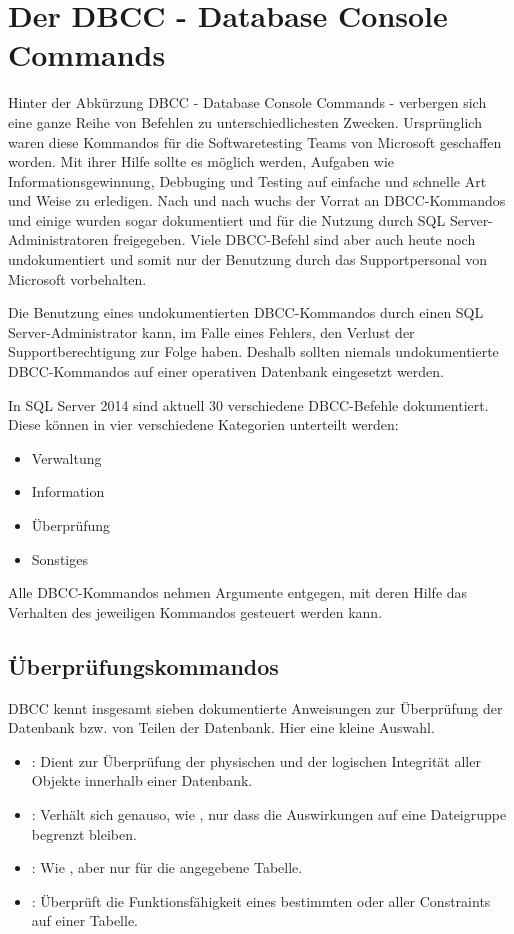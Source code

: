     \section{Der DBCC - Database Console Commands}
      Hinter der Abkürzung DBCC - Database Console Commands - verbergen sich
      eine ganze Reihe von Befehlen zu unterschiedlichesten Zwecken.
      Ursprünglich waren diese Kommandos f\"ur die Softwaretesting Teams von
      Microsoft geschaffen worden. Mit ihrer Hilfe sollte es möglich
      werden, Aufgaben wie Informationsgewinnung, Debbuging und Testing auf
      einfache und schnelle Art und Weise zu erledigen. Nach und nach wuchs
      der Vorrat an DBCC-Kommandos und einige wurden sogar dokumentiert und
      f\"ur die Nutzung durch SQL Server-Administratoren freigegeben. Viele
      DBCC-Befehl sind aber auch heute noch undokumentiert und somit nur der
      Benutzung durch das Supportpersonal von Microsoft vorbehalten.
      \begin{merke}
        Die Benutzung eines undokumentierten DBCC-Kommandos durch einen SQL
        Server-Administrator kann, im Falle eines Fehlers, den Verlust der
        Supportberechtigung zur Folge haben. Deshalb sollten niemals
        undokumentierte DBCC-Kommandos auf einer operativen Datenbank
        eingesetzt werden.
      \end{merke}
      In SQL Server 2014 sind aktuell 30 verschiedene DBCC-Befehle
      dokumentiert. Diese können in vier verschiedene Kategorien unterteilt
      werden:
      \begin{itemize}
          \item Verwaltung
          \item Information
          \item Überprüfung
          \item Sonstiges
      \end{itemize}
      Alle DBCC-Kommandos nehmen Argumente entgegen, mit deren Hilfe das
      Verhalten des jeweiligen Kommandos gesteuert werden kann.
      \subsection{Überprüfungskommandos}
        DBCC kennt  insgesamt sieben dokumentierte Anweisungen zur Überprüfung
        der Datenbank bzw. von Teilen der Datenbank. Hier eine kleine Auswahl.
        \begin{itemize}
          \item {}: Dient zur Überprüfung der
          physischen und der logischen Integrität aller Objekte innerhalb
          einer Datenbank.
          \item {}: Verhält sich genauso, wie
          , nur dass die Auswirkungen auf eine
          Dateigruppe begrenzt bleiben.
          \item {}: Wie , aber nur f\"ur die angegebene Tabelle.
          \item {}: Überprüft die
          Funktionsfähigkeit eines bestimmten oder aller Constraints auf
          einer Tabelle.
        \end{itemize}
